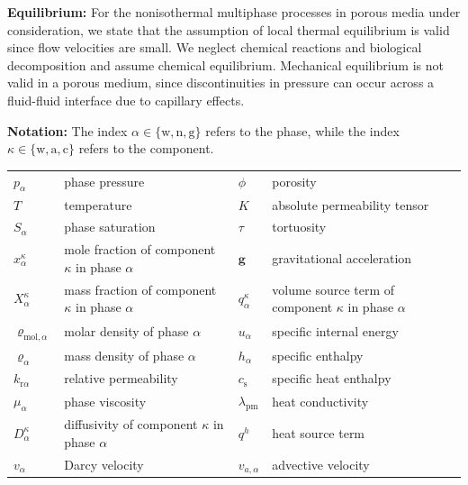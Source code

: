 \textbf{Equilibrium:}
For the nonisothermal multiphase processes in porous media under
consideration, we state that the assumption of local thermal
equilibrium is valid since flow velocities are small. We neglect
chemical reactions and biological decomposition and assume chemical
equilibrium.  Mechanical equilibrium is not valid in a porous medium, 
since discontinuities in pressure can occur across a fluid-fluid
interface due to capillary effects.

\textbf{Notation:} The index $\alpha \in \{\text{w}, \text{n}, \text{g}\}$ refers 
to the phase, while the index $\kappa \in \{\text{w}, \text{a}, \text{c}\}$ refers 
to the component. \\
\begin{tabular}{llll}
$p_\alpha$ & phase pressure & $\phi$ & porosity \\
$T$ & temperature & $K$ & absolute permeability tensor \\
$S_\alpha$ & phase saturation & $\tau$ & tortuosity \\
$x_\alpha^\kappa$ & mole fraction of component $\kappa$ in phase $\alpha$ & $\boldsymbol{g}$ & gravitational acceleration \\
$X_\alpha^\kappa$ & mass fraction of component $\kappa$ in phase $\alpha$ & $q^\kappa_\alpha$ & volume source term of component $\kappa$ in phase $\alpha$ \\
$\varrho_{\text{mol},\alpha}$ & molar density of phase $\alpha$ & $u_\alpha$ & specific internal energy \\
$\varrho_{\alpha}$ & mass density of phase $\alpha$ & $h_\alpha$ & specific enthalpy \\
$k_{\text{r}\alpha}$ & relative permeability & $c_\text{s}$ & specific heat enthalpy \\
$\mu_\alpha$ & phase viscosity & $\lambda_\text{pm}$ & heat conductivity \\
$D_\alpha^\kappa$ & diffusivity of component $\kappa$ in phase $\alpha$ & $q^h$ & heat source term \\
$v_\alpha$ & Darcy velocity & $v_{a,\alpha}$  & advective velocity
\end{tabular}


